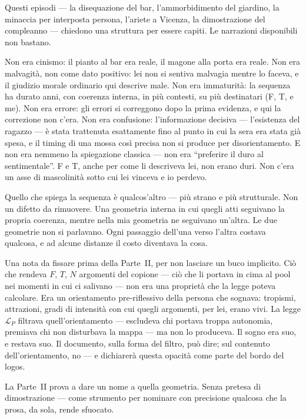 \documentclass[
    oneside,                 %
    openany,                 %
    titlepage,
    11pt,
    a4paper,
    italian,
    DIV=14,                  %
    headinclude,
    footinclude=true,
    cleardoublepage=empty
]{scrbook}
\theoremstyle{ctplain}
\theoremstyle{ctdef}
\theoremstyle{ctrem}
\newcommand{\LP}{\mathcal{L}_P}
\begin{document}
Questi episodi --- la disequazione del bar, l'ammorbidimento del giardino, la minaccia per interposta persona, l'ariete a Vicenza, la dimostrazione del compleanno --- chiedono una struttura per essere capiti. Le narrazioni disponibili non bastano.

Non era cinismo: il pianto al bar era reale, il magone alla porta era reale. Non era malvagità, non come dato positivo: lei non si sentiva malvagia mentre lo faceva, e il giudizio morale ordinario qui descrive male. Non era immaturità: la sequenza ha durato anni, con coerenza interna, in più contesti, su più destinatari (F, T, e me). Non era errore: gli errori si correggono dopo la prima evidenza, e qui la correzione non c'era. Non era confusione: l'informazione decisiva --- l'esistenza del ragazzo --- è stata trattenuta esattamente fino al punto in cui la sera era stata già spesa, e il timing di una mossa così precisa non si produce per disorientamento. E non era nemmeno la spiegazione classica --- non era ``preferire il duro al sentimentale''. F e T, anche per come li descriveva lei, non erano duri. Non c'era un asse di mascolinità sotto cui lei vinceva e io perdevo.

Quello che spiega la sequenza è qualcos'altro --- più strano e più strutturale. Non un difetto da rimuovere. Una geometria interna in cui quegli atti seguivano la propria coerenza, mentre nella mia geometria ne seguivano un'altra. Le due geometrie non si parlavano. Ogni passaggio dell'una verso l'altra costava qualcosa, e ad alcune distanze il costo diventava la cosa.

Una nota da fissare prima della Parte~II, per non lasciare un buco implicito. Ciò che rendeva $F$, $T$, $N$ argomenti del copione --- ciò che li portava in cima al pool nei momenti in cui ci salivano --- non era una proprietà che la legge poteva calcolare. Era un orientamento pre-riflessivo della persona che sognava: tropismi, attrazioni, gradi di intensità con cui quegli argomenti, per lei, erano vivi. La legge $\LP$ filtrava quell'orientamento --- escludeva chi portava troppa autonomia, premiava chi non disturbava la mappa --- ma non lo produceva. Il sogno era suo, e restava suo. Il documento, sulla forma del filtro, può dire; sul contenuto dell'orientamento, no --- e dichiarerà questa opacità come parte del bordo del logos.

La Parte~II prova a dare un nome a quella geometria. Senza pretesa di dimostrazione --- come strumento per nominare con precisione qualcosa che la prosa, da sola, rende sfuocato.
\end{document}

